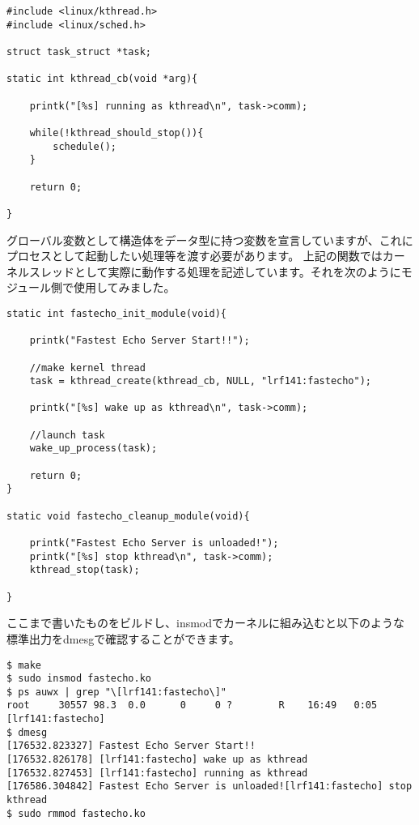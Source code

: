 \begin{verbatim}
#include <linux/kthread.h>
#include <linux/sched.h>

struct task_struct *task;

static int kthread_cb(void *arg){

    printk("[%s] running as kthread\n", task->comm);

    while(!kthread_should_stop()){
        schedule();
    }

    return 0;

}
\end{verbatim}

グローバル変数として構造体をデータ型に持つ変数を宣言していますが、これにプロセスとして起動したい処理等を渡す必要があります。
上記の関数ではカーネルスレッドとして実際に動作する処理を記述しています。それを次のようにモジュール側で使用してみました。

\begin{verbatim}
static int fastecho_init_module(void){

    printk("Fastest Echo Server Start!!");

    //make kernel thread
    task = kthread_create(kthread_cb, NULL, "lrf141:fastecho");
        
    printk("[%s] wake up as kthread\n", task->comm);

    //launch task
    wake_up_process(task);
        
    return 0;
}

static void fastecho_cleanup_module(void){

    printk("Fastest Echo Server is unloaded!");
    printk("[%s] stop kthread\n", task->comm);
    kthread_stop(task);

}
\end{verbatim}

ここまで書いたものをビルドし、insmodでカーネルに組み込むと以下のような標準出力をdmesgで確認することができます。
\begin{verbatim}
$ make
$ sudo insmod fastecho.ko
$ ps auwx | grep "\[lrf141:fastecho\]"
root     30557 98.3  0.0      0     0 ?        R    16:49   0:05 [lrf141:fastecho]
$ dmesg
[176532.823327] Fastest Echo Server Start!!
[176532.826178] [lrf141:fastecho] wake up as kthread
[176532.827453] [lrf141:fastecho] running as kthread
[176586.304842] Fastest Echo Server is unloaded![lrf141:fastecho] stop kthread
$ sudo rmmod fastecho.ko
\end{verbatim}

